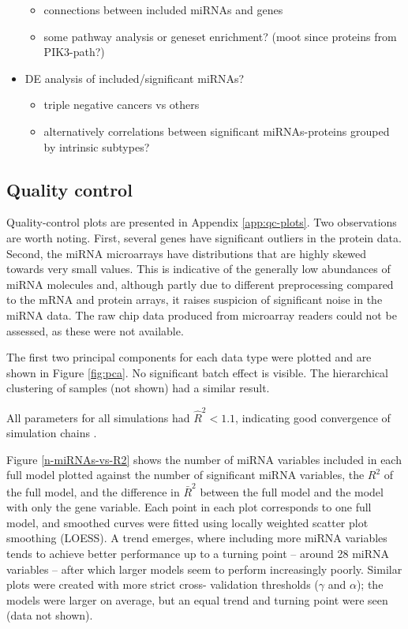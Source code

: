 \begin{itemize}
  \begin{itemize}
    \item connections between included miRNAs and genes
    \item some pathway analysis or geneset enrichment? (moot since proteins from PIK3-path?)
  \end{itemize}
  \item DE analysis of included/significant miRNAs?
  \begin{itemize}
    \item triple negative cancers vs others
    \item alternatively correlations between significant miRNAs-proteins grouped by intrinsic subtypes?
  \end{itemize}
\end{itemize}

\subsection{Quality control}

Quality-control plots are presented in Appendix \ref{app:qc-plots}. Two
observations are worth noting. First, several genes have significant outliers
in the protein data. Second, the miRNA microarrays have distributions that are
highly skewed towards very small values. This is indicative of the generally
low abundances of miRNA molecules and, although partly due to different
preprocessing compared to the mRNA and protein arrays, it raises suspicion of
significant noise in the miRNA data. The raw chip data produced from
microarray readers could not be assessed, as these were not available.

The first two principal components for each data type were plotted and are
shown in Figure \ref{fig:pca}. No significant batch effect is visible. The
hierarchical clustering of samples (not shown) had a similar result.


All parameters for all simulations had $\hat{R}^2 < 1.1$, indicating
good convergence of simulation chains \citep{Gelman2013}.

Figure \ref{n-miRNAs-vs-R2} shows the number of miRNA variables included in
each full model plotted against the number of significant miRNA variables, the
$R^2$ of the full model, and the difference in $\bar{R}^2$ between the full
model and the model with only the gene variable. Each point in each plot
corresponds to one full model, and smoothed curves were fitted using locally
weighted scatter plot smoothing (LOESS). A trend emerges, where including more
miRNA variables tends to achieve better performance up to a turning point --
around 28 miRNA variables -- after which larger models seem to perform
increasingly poorly. Similar plots were created with more strict cross-
validation thresholds ($\gamma$ and $\alpha$); the models were larger on
average, but an equal trend and turning point were seen (data not shown).

